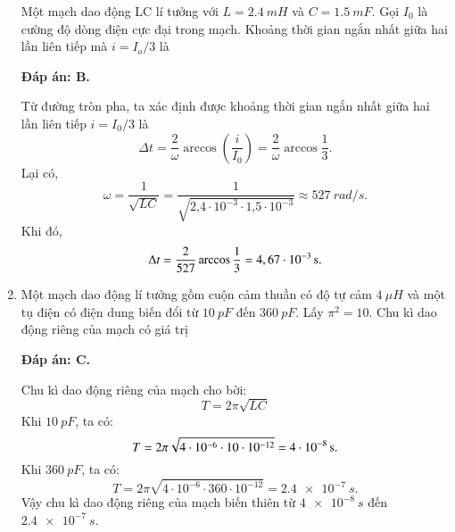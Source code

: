 \begin{enumerate}[label=\bfseries Câu \arabic*:]
	{Một mạch dao động LC lí tưởng với $L = \SI{2,4}{mH}$ và $C = \SI{1,5}{mF}$. Gọi $I_0$ là cường độ dòng điện cực đại trong mạch. Khoảng thời gian ngắn nhất giữa hai lần liên tiếp mà $i = I_o /3$ là
	}
	
	\hideall
	{		\textbf{Đáp án: B.}
		
		Từ đường tròn pha, ta xác định được khoảng thời gian ngắn nhất giữa hai lần liên tiếp $i=I_{0} / 3$ là
		$$
		\Delta t=\dfrac{2}{\omega} \arccos \left(\dfrac{i}{I_{0}}\right)=\dfrac{2}{\omega} \arccos \dfrac{1}{3}.
		$$
		Lại có,
		$$
		\omega=\dfrac{1}{\sqrt{L C}}=\dfrac{1}{\sqrt{\text{2,4}\cdot10^{-3} \cdot \text{1,5} \cdot 10^{-3}}} \approx \SI{527}{rad/s}.
		$$
		Khi đó,
		$$
		\Delta t=\dfrac{2}{527} \arccos \dfrac{1}{3}= \xsi{4,67\cdot10^{-3}}{s}.
		$$
		
		
	}
	
	\item {}
	
	{Một mạch dao động lí tưởng gồm cuộn cảm thuần có độ tự cảm $\SI{4}{\mu H}$ và một tụ điện có điện dung biến đổi từ $\SI{10}{pF}$ đến $\SI{360}{pF}$. Lấy $\pi^2 = 10$. Chu kì dao động riêng của mạch có giá trị
	}
	
	\hideall
	{		\textbf{Đáp án: C.}
		
		Chu kì dao động riêng của mạch cho bời:
		$$
		T=2 \pi \sqrt{L C}
		$$
		Khi $\SI{10}{pF}$, ta có:
		$$
		T=2 \pi \sqrt{4\cdot10^{-6} \cdot 10\cdot10^{-12}}= \xsi{4\cdot10^{-8}}{s}.
		$$
		Khi $\SI{360}{pF}$, ta có:
		$$
		T=2 \pi \sqrt{4\cdot10^{-6} \cdot 360\cdot10^{-12}}= \SI{2,4 e-7}{s}.
		$$
		Vậy chu kì dao động riêng của mạch biến thiên từ $\SI{4 e-8}{s}$ đến $\SI{2,4 e-7}{s}$.
		
}
\end{enumerate}
